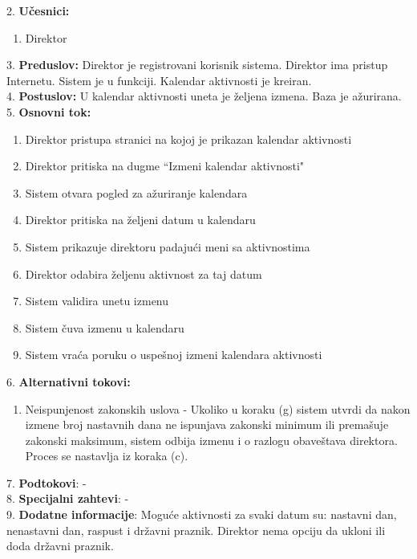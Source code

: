 \documentclass{article}
\begin{document}
2. \textbf{Učesnici:}
\begin{enumerate} [label=(\alph*)]
\item Direktor
\end{enumerate} 

3. \textbf{Preduslov:} Direktor je registrovani korisnik sistema. Direktor ima pristup Internetu. Sistem je u funkciji. Kalendar aktivnosti je kreiran. \\

4. \textbf{Postuslov:} U kalendar aktivnosti uneta je željena izmena. Baza je ažurirana. \\

5. \textbf{Osnovni tok:} 
\begin{enumerate} [label=(\alph*)]
\item Direktor pristupa stranici na kojoj je prikazan kalendar aktivnosti
\item Direktor pritiska na dugme ``Izmeni kalendar aktivnosti"  
\item Sistem otvara pogled za ažuriranje kalendara
\item Direktor pritiska na željeni datum u kalendaru
\item Sistem prikazuje direktoru padajući meni sa aktivnostima
\item Direktor odabira željenu aktivnost za taj datum
\item Sistem validira unetu izmenu
\item Sistem čuva izmenu u kalendaru
\item Sistem vraća poruku o uspešnoj izmeni kalendara aktivnosti 
\end{enumerate}

6. \textbf{Alternativni tokovi:}
\begin{enumerate} [label=(\roman*)]
\item Neispunjenost zakonskih uslova - Ukoliko u koraku (g) sistem utvrdi da nakon izmene broj nastavnih dana ne ispunjava zakonski minimum ili premašuje zakonski maksimum, sistem odbija izmenu i o razlogu obaveštava direktora. Proces se nastavlja iz koraka (c).
\end{enumerate}

7. \textbf{Podtokovi}:  - \\

8. \textbf{Specijalni zahtevi}: - \\

9. \textbf{Dodatne informacije}: Moguće aktivnosti za svaki datum su: nastavni dan, nenastavni dan, raspust i državni praznik. Direktor nema opciju da ukloni ili doda državni praznik. \\
\end{document}
